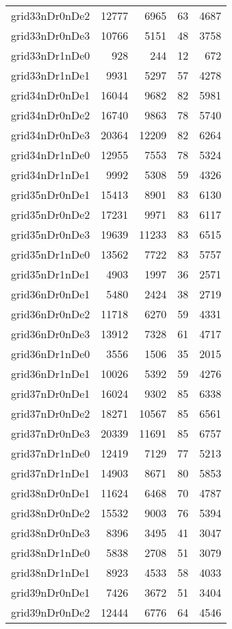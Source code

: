 \begin{longtable}{lrrrr}
grid33nDr0nDe2 & 12777 & 6965 & 63 & 4687 \\
grid33nDr0nDe3 & 10766 & 5151 & 48 & 3758 \\
grid33nDr1nDe0 & 928 & 244 & 12 & 672 \\
grid33nDr1nDe1 & 9931 & 5297 & 57 & 4278 \\
grid34nDr0nDe1 & 16044 & 9682 & 82 & 5981 \\
grid34nDr0nDe2 & 16740 & 9863 & 78 & 5740 \\
grid34nDr0nDe3 & 20364 & 12209 & 82 & 6264 \\
grid34nDr1nDe0 & 12955 & 7553 & 78 & 5324 \\
grid34nDr1nDe1 & 9992 & 5308 & 59 & 4326 \\
grid35nDr0nDe1 & 15413 & 8901 & 83 & 6130 \\
grid35nDr0nDe2 & 17231 & 9971 & 83 & 6117 \\
grid35nDr0nDe3 & 19639 & 11233 & 83 & 6515 \\
grid35nDr1nDe0 & 13562 & 7722 & 83 & 5757 \\
grid35nDr1nDe1 & 4903 & 1997 & 36 & 2571 \\
grid36nDr0nDe1 & 5480 & 2424 & 38 & 2719 \\
grid36nDr0nDe2 & 11718 & 6270 & 59 & 4331 \\
grid36nDr0nDe3 & 13912 & 7328 & 61 & 4717 \\
grid36nDr1nDe0 & 3556 & 1506 & 35 & 2015 \\
grid36nDr1nDe1 & 10026 & 5392 & 59 & 4276 \\
grid37nDr0nDe1 & 16024 & 9302 & 85 & 6338 \\
grid37nDr0nDe2 & 18271 & 10567 & 85 & 6561 \\
grid37nDr0nDe3 & 20339 & 11691 & 85 & 6757 \\
grid37nDr1nDe0 & 12419 & 7129 & 77 & 5213 \\
grid37nDr1nDe1 & 14903 & 8671 & 80 & 5853 \\
grid38nDr0nDe1 & 11624 & 6468 & 70 & 4787 \\
grid38nDr0nDe2 & 15532 & 9003 & 76 & 5394 \\
grid38nDr0nDe3 & 8396 & 3495 & 41 & 3047 \\
grid38nDr1nDe0 & 5838 & 2708 & 51 & 3079 \\
grid38nDr1nDe1 & 8923 & 4533 & 58 & 4033 \\
grid39nDr0nDe1 & 7426 & 3672 & 51 & 3404 \\
grid39nDr0nDe2 & 12444 & 6776 & 64 & 4546 \\

\end{longtable}
